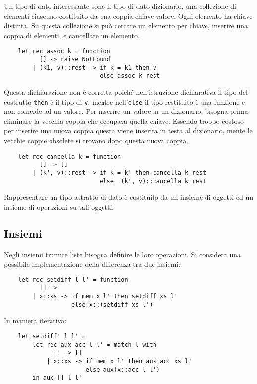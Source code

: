 \documentclass{article}
\numberwithin{equation}{subsection}
\begin{document}
Un tipo di dato interessante sono il tipo di dato dizionario, una collezione di elementi ciascuno costituito da una coppia chiave-valore. Ogni elemento ha chiave distinta. 
Su questa collezione si può cercare un elemento per chiave, inserire una coppia di elementi, e cancellare un elemento. 
\begin{verbatim}
    let rec assoc k = function
          [] -> raise NotFound
        | (k1, v)::rest -> if k = k1 then v
                           else assoc k rest
\end{verbatim}
Questa dichiarazione non è corretta poiché nell'istruzione dichiarativa il tipo del costrutto \verb|then| è il tipo di \verb|v|, mentre nell'\verb|else| il tipo restituito è una funzione e non coincide ad un valore. 
Per inserire un valore in un dizionario, bisogna prima eliminare la vecchia coppia che occupava quella chiave. Essendo troppo costoso per inserire una nuova coppia questa viene inserita in testa al dizionario, mente le vecchie coppie obsolete si trovano dopo questa nuova coppia. 
\begin{verbatim}
    let rec cancella k = function
          [] -> []
        | (k', v)::rest -> if k = k' then cancella k rest
                           else  (k', v)::cancella k rest
\end{verbatim}



Rappresentare un tipo astratto di dato è costituito da un insieme di oggetti ed un insieme di operazioni su tali oggetti.  %


\subsection{Insiemi}

Negli insiemi tramite liste bisogna definire le loro operazioni. Si considera una possibile implementazione della differenza tra due insiemi:
\begin{verbatim}
    let rec setdiff l l' = function 
          [] -> 
        | x::xs -> if mem x l' then setdiff xs l'
                   else x::(setdiff xs l')
\end{verbatim}
In maniera iterativa:
\begin{verbatim}
    let setdiff' l l' = 
        let rec aux acc l l' = match l with
              [] -> []
            | x::xs -> if mem x l' then aux acc xs l'
                       else aux(x::acc l l')
        in aux [] l l'
\end{verbatim}
\end{document}
